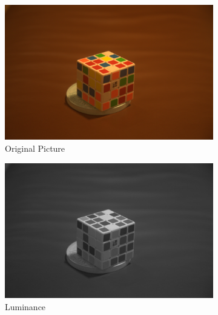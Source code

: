 \documentclass{article}
\begin{document}
\begin{figure}[h!]
\centering
\begin{subfigure}[b]{0.4\textwidth}
\caption{Original Picture}
\begin{center}
	\includegraphics[width=\textwidth]{./implementation/experiment/out.png}
\end{center}
\end{subfigure}%
\begin{subfigure}[b]{0.4\textwidth}
\caption{Luminance}
\begin{center}
	\includegraphics[width=\textwidth]{./implementation/experiment/Y.png}
\end{center}
\end{subfigure}
\begin{subfigure}[b]{0.4\textwidth}
\begin{center}

\end{center}
\end{subfigure}
\end{figure}
\end{document}
